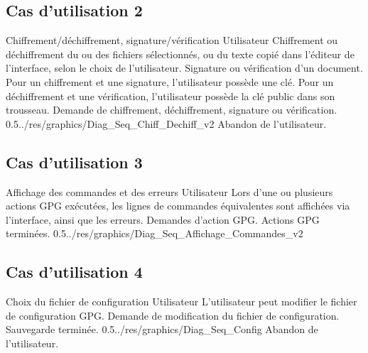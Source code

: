 \documentclass{../res/univ-projet}
\begin{document}
\subsection{Cas d'utilisation 2}
\ficheGraphic
{Chiffrement/déchiffrement, signature/vérification}
{Utilisateur}
{Chiffrement ou déchiffrement du ou des fichiers sélectionnés, ou du texte copié dans l'éditeur de l'interface, selon le choix de l'utilisateur. Signature ou vérification d'un document.}
{Pour un chiffrement et une signature, l'utilisateur possède une clé. Pour un déchiffrement et une vérification, l'utilisateur possède la clé public dans son trousseau.}
{Demande de chiffrement, déchiffrement, signature ou vérification.}
{}
{0.5}{../res/graphics/Diag_Seq_Chiff_Dechiff_v2}
{Abandon de l'utilisateur.}
\vspace{0.5cm}

\subsection{Cas d'utilisation 3}
\ficheGraphic
{Affichage des commandes et des erreurs}
{Utilisateur}
{Lors d'une ou plusieurs actions GPG exécutées, les lignes de commandes équivalentes sont affichées via l'interface, ainsi que les erreurs.}
{}
{Demandes d'action GPG.}
{Actions GPG terminées.}
{0.5}{../res/graphics/Diag_Seq_Affichage_Commandes_v2}
{}   
\vspace{0.5cm}

\subsection{Cas d'utilisation 4}
\ficheGraphic
{Choix du fichier de configuration}
{Utilisateur}
{L'utilisateur peut modifier le fichier de configuration GPG.}
{}
{Demande de modification du fichier de configuration.}
{Sauvegarde terminée.}
{0.5}{../res/graphics/Diag_Seq_Config}
{Abandon de l'utilisateur.}
\vspace{0.5cm}
\end{document}
